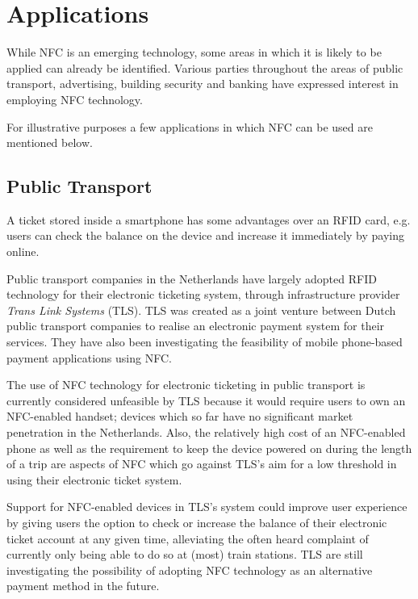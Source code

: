\section{Applications}
While NFC is an emerging technology, some areas in which it is likely to be applied can already be identified.
Various parties throughout the areas of public transport, advertising, building security and banking have expressed interest in employing NFC technology.

For illustrative purposes a few applications in which NFC can be used are mentioned below.

\subsection{Public Transport}
A ticket stored inside a smartphone has some advantages over an RFID card, e.g. users can check the balance on the device and increase it immediately by paying online.

Public transport companies in the Netherlands have largely adopted RFID technology for their electronic ticketing system, through infrastructure provider \textit{Trans Link Systems} (TLS).
TLS was created as a joint venture between Dutch public transport companies to realise an electronic payment system for their services.
They have also been investigating the feasibility of mobile phone-based payment applications using NFC. \cite{cipit_artikel}

The use of NFC technology for electronic ticketing in public transport is currently considered unfeasible by TLS because it would require users to own an NFC-enabled handset; devices which so far have no significant market penetration in the Netherlands.
Also, the relatively high cost of an NFC-enabled phone as well as the requirement to keep the device powered on during the length of a trip are aspects of NFC which go against TLS's aim for a low threshold in using their electronic ticket system.

Support for NFC-enabled devices in TLS's system could improve user experience by giving users the option to check or increase the balance of their electronic ticket account at any given time, alleviating the often heard complaint of currently only being able to do so at (most) train stations.
TLS are still investigating the possibility of adopting NFC technology as an alternative payment method in the future. \cite{OVchipkaart} %

